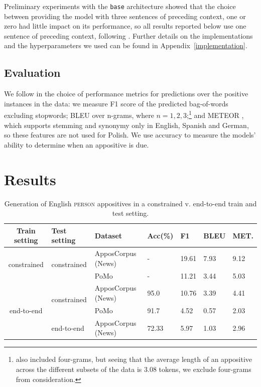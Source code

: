 \documentclass[11pt]{article}
\begin{document}
Preliminary experiments with the \texttt{base}  architecture showed that the choice between providing the model with three sentences of preceding context, one or zero had little impact on its performance, so all results reported below use one sentence of preceding context, following . Further details on the implementations and the hyperparameters we used can be found in Appendix~\ref{implementation}. 

\subsection{Evaluation}
We follow  in the choice of performance metrics for predictions over the positive instances in the data: we measure F1 score of the predicted bag-of-words excluding stopwords; BLEU \cite{10.3115/1073083.1073135} over n-grams, where $n=1,2,3$;\footnote{ also included four-grams, but seeing that the average length of an appositive across the different subsets of the data is 3.08 tokens, we exclude four-grams from consideration.} and METEOR \cite{denkowski-lavie-2014-meteor}, which supports stemming and synonymy only in English, Spanish and German, so these features are not used for Polish. We use accuracy to measure the models' ability to determine when an appositive is due. 

\section{Results}
\label{sec:results}

\begin{table}
    \centering
    \small
    \begin{tabular}{cllllll}
         Train setting&Test setting&Dataset&Acc(\%)&F1 & BLEU & MET. \\ 
         \hline
         \multirow{2}{*}{constrained}&
         \multirow{2}{*}{constrained}& ApposCorpus (News) & - & 19.61	&7.93	&9.12 \\
         && PoMo & - &  11.21&	3.44&	5.03 \vspace{1mm}\\
         \multirow{4}{*}{end-to-end}&\multirow{2}{*}{constrained}& ApposCorpus (News) & 95.0 & 10.76 & 3.39 & 4.41 \\
         &&PoMo&91.7 & 4.52	&0.57	&2.03\vspace{1mm}\\ 
         &end-to-end&ApposCorpus (News) &72.33 & 5.97 & 1.03 & 2.96\\

    \end{tabular}
    \caption{Generation of English \textsc{person} appositives in a constrained v. end-to-end train and test setting.}
    \label{tab:RQ1}
\end{table}
\end{document}
